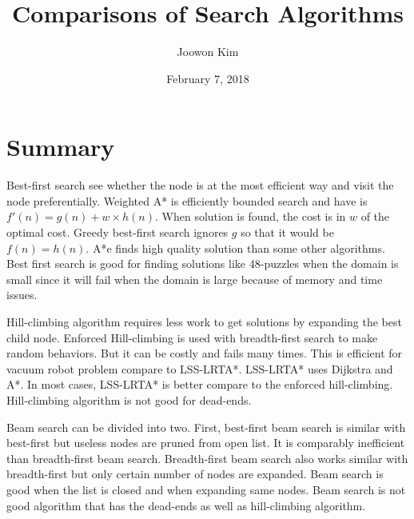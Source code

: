 \documentclass[12pt]{article}
\begin{document}
\title{Comparisons of Search Algorithms}
\author{Joowon Kim}
\date{February 7, 2018}
\maketitle
\hrulefill
\section{Summary}
Best-first search see whether the node is at the most efficient way and visit the node preferentially. Weighted A* is efficiently bounded search and have is \( f'(n) = g(n) + w \times h(n) \). When solution is found, the cost is in \(w\) of the optimal cost. Greedy best-first search ignores \(g\) so that it would be \(f(n) = h(n)\). \cite{techreport} A*e finds high quality solution than some other algorithms. Best first search is good for finding solutions like 48-puzzles when the domain is small since it will fail when the domain is large because of memory and time issues. \par
    Hill-climbing \cite{conference} algorithm requires less work to get solutions by expanding the best child node. Enforced Hill-climbing is used with breadth-first search to make random behaviors. But it can be costly and fails many times. This is efficient for vacuum robot problem \cite{book} compare to LSS-LRTA*. LSS-LRTA* uses Dijkstra and A*. In most cases, LSS-LRTA* \cite{journal} is better compare to the enforced hill-climbing. Hill-climbing algorithm is not good for dead-ends. \par
    Beam search can be divided into two. First, best-first beam search is similar with best-first but useless nodes are pruned from open list. It is comparably inefficient than breadth-first beam search. Breadth-first beam search also works similar with breadth-first but only certain number of nodes are expanded. \cite{chapter} Beam search is good when the list is closed and when expanding same nodes. Beam search is not good algorithm that has the dead-ends as well as hill-climbing algorithm.
    
\hrulefill
\end{document}
